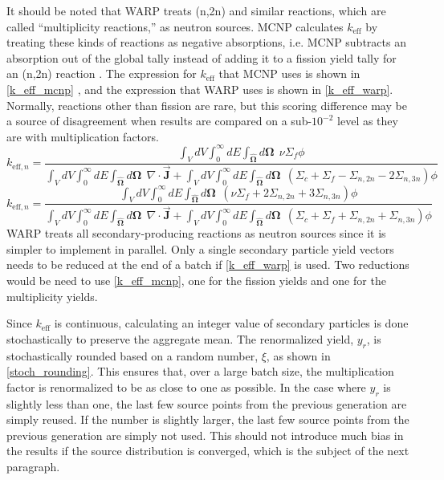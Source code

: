It should be noted that WARP treats (n,2n) and similar reactions, which are called ``multiplicity reactions,'' as neutron sources.  MCNP calculates $k_\mathrm{eff}$ by treating these kinds of reactions as negative absorptions, i.e. MCNP subtracts an absorption out of the global tally instead of adding it to a fission yield tally for an (n,2n) reaction \cite{mcnp}.  The expression for $k_\mathrm{eff}$ that MCNP uses is shown in \eqref{k_eff_mcnp} \cite{mcnp}, and the expression that WARP uses is shown in \eqref{k_eff_warp}.  Normally, reactions other than fission are rare, but this scoring difference may be a source of disagreement when results are compared on a sub-$10^{-2}$ level as they are with multiplication factors.
%
\begin{equation}
\label{k_eff_mcnp}
k_{\mathrm{eff},n} = \frac{ \int_{V} dV \int_0^\infty dE \int_{\boldsymbol{\hat{\Omega}}} d\boldsymbol{\Omega} \:\: \nu \Sigma_f \phi}{\int_{V} dV \int_0^\infty dE \int_{\boldsymbol{\hat{\Omega}}} d\boldsymbol{\Omega} \:\: \nabla \cdot \boldsymbol{\vec{J}}  + \int_{V} dV \int_0^\infty dE \int_{\boldsymbol{\hat{\Omega}}} d\boldsymbol{\Omega} \:\: (\Sigma_c + \Sigma_f - \Sigma_{n,2n} - 2\Sigma_{n,3n}) \phi}
\end{equation}
%
\begin{equation}
\label{k_eff_warp}
k_{\mathrm{eff},n} = \frac{ \int_{V} dV \int_0^\infty dE \int_{\boldsymbol{\hat{\Omega}}} d\boldsymbol{\Omega} \:\: (\nu \Sigma_f + 2\Sigma_{n,2n} + 3\Sigma_{n,3n})\phi}{\int_{V} dV \int_0^\infty dE \int_{\boldsymbol{\hat{\Omega}}} d\boldsymbol{\Omega} \:\: \nabla \cdot \boldsymbol{\vec{J}}  + \int_{V} dV \int_0^\infty dE \int_{\boldsymbol{\hat{\Omega}}} d\boldsymbol{\Omega} \:\: (\Sigma_c + \Sigma_f + \Sigma_{n,2n} + \Sigma_{n,3n}) \phi}
\end{equation}
%
WARP treats all secondary-producing reactions as neutron sources since it is simpler to implement in parallel.  Only a single secondary particle yield vectors needs to be reduced at the end of a batch if \eqref{k_eff_warp} is used.  Two reductions would be need to use \eqref{k_eff_mcnp}, one for the fission yields and one for the multiplicity yields.

Since $k_\mathrm{eff}$ is continuous, calculating an integer value of secondary particles is done stochastically to preserve the aggregate mean.  The renormalized yield, $y_r$, is stochastically rounded based on a random number, $\xi$, as shown in  \eqref{stoch_rounding}.  This ensures that, over a large batch size, the multiplication factor is renormalized to be as close to one as possible.  In the case where $y_r$ is slightly less than one, the last few source points from the previous generation are simply reused. If the number is slightly larger, the last few source points from the previous generation are simply not used. %
 This should not introduce much bias in the results if the source distribution is converged, which is the subject of the next paragraph.

